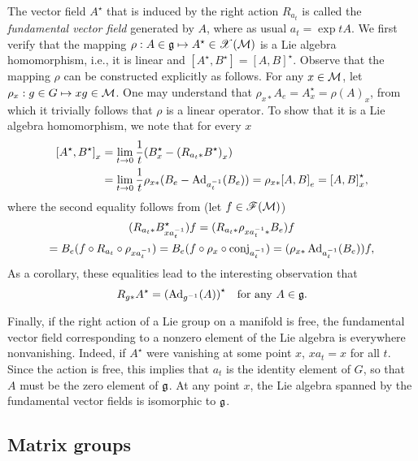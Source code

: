 \documentclass[
final,
11pt,
a4paper,
DIV=11,
headinclude=true,
footinclude=false,
bibliography=totoc,
twoside=true,  %
BCOR=5mm
]{scrbook}
\begin{document}
The vector field $A^\star$ that is induced by the right action 
$R_{a_t}$ is called the \emph{fundamental vector field} generated 
by $A$, where as usual $a_t = \exp tA$. We first verify that the 
mapping $\rho : A \in \mathfrak{g} \mapsto A^\star \in 
\mathscr{X}(\mathcal{M})$ is a Lie algebra homomorphism, i.e., it is 
linear and $[A^\star, B^\star] = {[A,B]}^\star$. Observe that the 
mapping $\rho$ can be constructed explicitly as follows. For any 
$x \in \mathcal{M}$, let $\rho_x : g \in G \mapsto xg \in \mathcal{M}$. One 
may understand that $\rho_{x*} A_e = A^\star_x = {\rho(A)}_x$, 
from which it trivially follows that $\rho$ is a linear operator. 
To show that it is a Lie algebra homomorphism, we note that for 
every $x$
\begin{align*}
  {[A^\star, B^\star]}_x
  &= \lim_{t \to 0} \frac{1}{t}(B^\star_x - {(R_{a_t*} 
    B^\star)}_x)
    \\
    &= \lim_{t \to 0} \frac{1}{t} \rho_{x*} (B_e - 
    \operatorname{Ad}_{a_t^{-1}}(B_e))
    = \rho_{x*} {[A,B]}_e = {[A,B]}^\star_x,
\end{align*}
where the second equality follows from (let $f \in 
\mathscr{F}(\mathcal{M})$)
\begin{multline*}
  (R_{a_t*} B^\star_{x a_t^{-1}}) f
    = (R_{a_t*} \rho_{x a_t^{-1}*} B_e) f
    \\
    = B_e(f \circ R_{a_t} \circ \rho_{x a_t^{-1}})
    = B_e(f \circ \rho_x \circ \mathrm{conj}_{a_t^{-1}})
    = (\rho_{x*} \operatorname{Ad}_{a_t^{-1}}(B_e)) f,
\end{multline*}
As a corollary, these equalities lead to the interesting 
observation that
\begin{equation}
\label{eq:Ract_fund_Ad}
  R_{g*}A^\star = {(\operatorname{Ad}_{g^{-1}} (A))}^\star
  \quad\text{for any}~A \in \mathfrak{g}.
\end{equation}

Finally, if the right action of a Lie group on a manifold is 
free, the fundamental vector field corresponding to a nonzero 
element of the Lie algebra is everywhere nonvanishing. Indeed, if 
$A^\star$ were vanishing at some point $x$, $xa_t = x$ for all 
$t$. Since the action is free, this implies that $a_t$ is the 
identity element of $G$, so that $A$ must be the zero element of 
$\mathfrak{g}$.
At any point $x$, the Lie algebra spanned by the fundamental 
vector fields is isomorphic to $\mathfrak{g}$.

\subsection{Matrix groups}
\label{ssec:matrix_groups}
\end{document}
